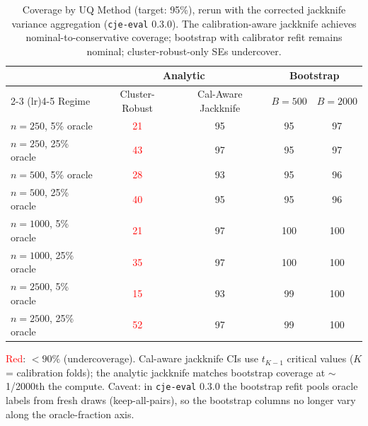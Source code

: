 \begin{table}[t]
\centering
\caption{Coverage by UQ Method (target: 95\%), rerun with the corrected jackknife variance aggregation (\texttt{cje-eval} 0.3.0). The calibration-aware jackknife achieves nominal-to-conservative coverage; bootstrap with calibrator refit remains nominal; cluster-robust-only SEs undercover.}
\label{tab:uq-comparison}
\small
\setlength{\tabcolsep}{4pt}
\begin{tabular}{lcccc}
\toprule
& \multicolumn{2}{c}{Analytic} & \multicolumn{2}{c}{Bootstrap} \\
\cmidrule(lr){2-3} \cmidrule(lr){4-5}
Regime & Cluster-Robust & Cal-Aware Jackknife & $B{=}500$ & $B{=}2000$ \\
\midrule
$n{=}250$, 5\% oracle & \textcolor{red}{21} & 95 & 95 & 97 \\
$n{=}250$, 25\% oracle & \textcolor{red}{43} & 97 & 95 & 97 \\
$n{=}500$, 5\% oracle & \textcolor{red}{28} & 93 & 95 & 96 \\
$n{=}500$, 25\% oracle & \textcolor{red}{40} & 95 & 95 & 96 \\
$n{=}1000$, 5\% oracle & \textcolor{red}{21} & 97 & 100 & 100 \\
$n{=}1000$, 25\% oracle & \textcolor{red}{35} & 97 & 100 & 100 \\
$n{=}2500$, 5\% oracle & \textcolor{red}{15} & 93 & 99 & 100 \\
$n{=}2500$, 25\% oracle & \textcolor{red}{52} & 97 & 99 & 100 \\
\bottomrule
\end{tabular}

\vspace{1mm}
\footnotesize{\textcolor{red}{Red}: $< 90\%$ (undercoverage). Cal-aware jackknife CIs use $t_{K-1}$ critical values ($K$ = calibration folds); the analytic jackknife matches bootstrap coverage at $\sim$1/2000th the compute. Caveat: in \texttt{cje-eval} 0.3.0 the bootstrap refit pools oracle labels from fresh draws (keep-all-pairs), so the bootstrap columns no longer vary along the oracle-fraction axis.}
\end{table}
